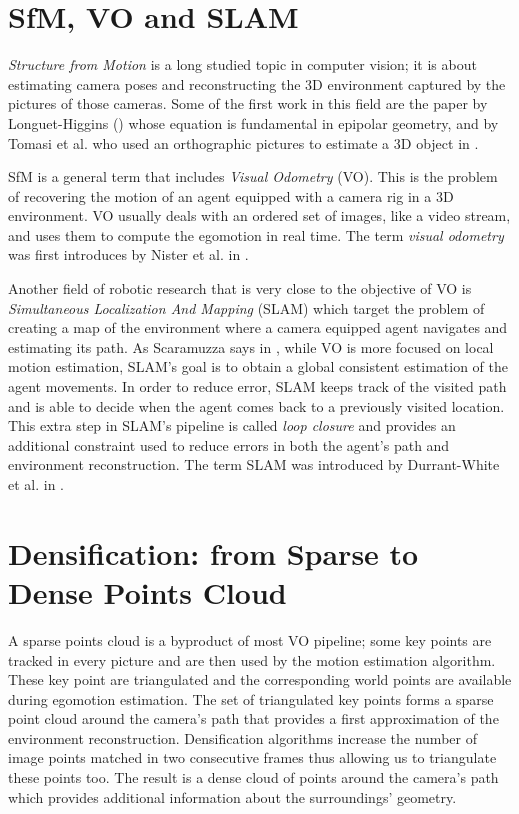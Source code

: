 \section{SfM, VO and SLAM}
\textit{Structure from Motion} is a long studied topic in computer vision; 
it is about estimating camera poses and 
reconstructing the 3D environment captured by the 
pictures of those cameras.
Some of the first work in this field are the paper by Longuet-Higgins 
(\cite{longuet1981computer}) whose equation is fundamental in epipolar geometry,
and by Tomasi et al. who used an orthographic pictures to estimate a 3D object 
in \cite{tomasi1992shape}.

SfM is a general term that includes \textit{Visual Odometry} (VO). This is 
the problem of recovering the motion of an agent equipped with a camera rig in 
a 3D environment. VO usually deals with an ordered set of images, like a video 
stream, and uses them to compute the egomotion in real time.
The term \textit{visual odometry} was first introduces by Nister et al. 
in \cite{nister2004visual}.

Another field of robotic research that is very close to the objective of VO is
\textit{Simultaneous Localization And Mapping} (SLAM) which target the problem 
of creating a map of the environment where a camera equipped agent navigates 
and estimating its path.
As Scaramuzza says in \cite{scaramuzzaVisualOdometryI}, while VO is more 
focused on local motion estimation, SLAM's goal is to obtain a global 
consistent estimation of the agent movements.
In order to reduce error, SLAM keeps track of the visited path and is able to 
decide when the agent comes back to a previously visited location.
This extra step in SLAM's pipeline is called \textit{loop closure} and provides 
an additional constraint used to reduce errors in both the agent's path and 
environment reconstruction.
The term SLAM was introduced by Durrant-White et al. in 
\cite{durrant1996localization}.

\section{Densification: from Sparse to Dense Points Cloud}
A sparse points cloud is a byproduct of most VO pipeline; 
some key points are tracked in every picture and are then used by the motion 
estimation algorithm. These key point are triangulated and the 
corresponding world points are available during egomotion estimation.
The set of triangulated key points forms a sparse point cloud around the 
camera's path that provides a first approximation of the environment 
reconstruction.
Densification algorithms increase the number of image points matched in two 
consecutive frames thus allowing us to triangulate these points too. 
The result is a dense cloud of points around the camera's path which provides 
additional information about the surroundings' geometry.

